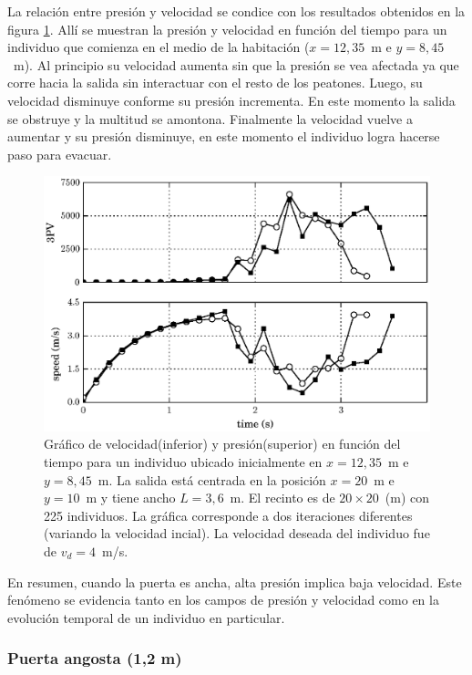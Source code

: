 La relación entre presión y velocidad se condice con los resultados obtenidos en la figura \ref{pv_vel_t_100_3_6}. Allí se muestran la presión y velocidad en función del tiempo para un individuo que comienza en el medio de la habitación ($x=12,35$~m e $y=8,45$~m). Al principio su velocidad aumenta sin que la presión se vea afectada ya que corre hacia la salida sin interactuar con el resto de los peatones. Luego, su velocidad disminuye conforme su presión incrementa. En este momento la salida se obstruye y la multitud se amontona. Finalmente la velocidad vuelve a aumentar y su presión disminuye, en este momento el individuo logra hacerse paso para evacuar. 

\begin{figure}[H]
    \centering
    \includegraphics[scale=0.8]{figuras/pv_vel_t_100_3_6.eps}
    \caption[width=5cm]{Gráfico de velocidad(inferior) y presión(superior) en función del tiempo para un individuo ubicado inicialmente en $x=12,35$~m e $y=8,45$~m.  La salida está centrada en la posición $x=20$~m e $y=10$~m y tiene ancho $L=3,6$~m. El recinto es de $20\times 20$~(m) con 225 individuos. La gráfica corresponde a dos iteraciones diferentes (variando la velocidad incial). La velocidad deseada del individuo fue de $v_d=4$~m/s.}
    \label{pv_vel_t_100_3_6}
\end{figure}

En resumen, cuando la puerta es ancha, alta presión implica baja velocidad. Este fenómeno se evidencia tanto en los campos de presión y velocidad como en la evolución temporal de un individuo en particular. 

\subsubsection{Puerta angosta (1,2 m)}

